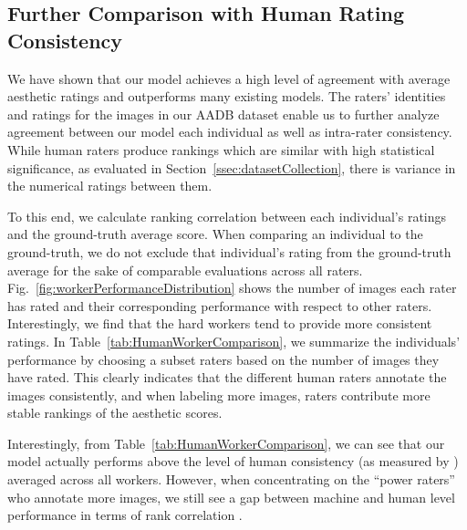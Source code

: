 \documentclass[runningheads]{llncs}
\begin{document}
\subsection{Further Comparison with Human Rating Consistency}

\begin{comment}
\begin{figure}[t]
\centering
\texttt{[image: workerPerformanceDistribution\_ECCV]}
\caption{Panels show (left) the number of images labeled by each worker,
   and the performance of each individual rater w.r.t Spearman's  (Right).
   Red line shows our model's performance.}
\label{fig:workerPerformanceDistribution}
\end{figure}
\end{comment}

We have shown that our model achieves a high level of agreement with average
aesthetic ratings and outperforms many existing models.  The raters' identities
and ratings for the images in our AADB dataset enable us to further analyze
agreement between our model each individual as well as intra-rater consistency.
While human raters produce rankings which are similar with high statistical
significance, as evaluated in Section~\ref{ssec:datasetCollection}, there is
variance in the numerical ratings between them.

To this end, we calculate ranking correlation 
between each individual's ratings and the ground-truth average score.
When comparing an individual to the ground-truth, we do not exclude that
individual's rating from the ground-truth average for the sake of comparable
evaluations across all raters.
Fig.~\ref{fig:workerPerformanceDistribution} shows
the number of images each rater has rated and their corresponding performance
with respect to other raters.  Interestingly, we find that the
hard workers tend to provide more consistent ratings.
In Table~\ref{tab:HumanWorkerComparison}, we summarize the individuals'
performance by choosing a subset raters based on the number of images they have
rated.  This clearly indicates that the different human raters annotate the images
consistently, and when labeling more images, raters contribute more
stable rankings of the aesthetic scores.

Interestingly, from Table~\ref{tab:HumanWorkerComparison},
we can see that our
model actually performs above the level of human consistency (as measured by
) averaged across all workers.  However, when concentrating on the
``power raters'' who annotate more images, we still see a gap between machine and
human level performance in terms of rank correlation .
\end{document}
